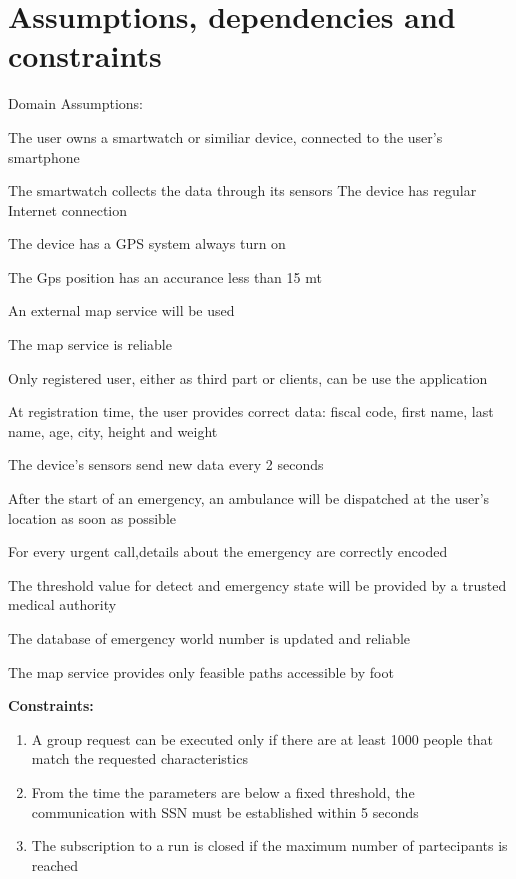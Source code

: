 \section{Assumptions, dependencies and constraints}
Domain Assumptions:
\begin{enumerate}[label={[}D.\arabic*{]}]

\item \label{d:1}
The user owns a smartwatch or similiar device, connected to the user’s smartphone
\item\label{d:2}
The smartwatch collects the data through its sensors
\itm\label{d:3}
The device has regular Internet connection 
\item\label{d:4}
The device has a GPS system always turn on
\item\label{d:4}
The Gps position has an accurance less than 15 mt
\item\label{d:5}
An external map service will be used
\item\label{d:6}
The map service is reliable
\item\label{d:7}
Only registered user, either as third part or clients, can be use the application
\item\label{d:8}
At registration time, the user provides correct data: fiscal code, first name, last name, age, city, height and weight
\item\label{d:9}
The device’s sensors send new data every 2 seconds
\item\label{d:10}
After the start of an emergency, an ambulance will be dispatched at the user’s location as soon as possible
\item\label{d:11}
For every urgent call,details about the emergency are correctly encoded
\item\label{d:12}
The threshold value for detect and emergency state will be provided by a trusted medical authority
\item\label{d:13}
The database of emergency world number is updated and reliable
\item\label{d:14}
The map service provides only feasible paths accessible by foot
\end{enumerate}

\textbf{Constraints:}

\begin{enumerate}
    \item\label{c:1}	A group request can be executed only if there are at least 1000 people that match the requested characteristics 
    \item\label{c:2}
    From the time the parameters are below a fixed threshold, the communication with SSN must be established within 5 seconds
    \item\label{c:3}
    The subscription to a run is closed if the maximum number of partecipants is reached
\end{enumerate}


